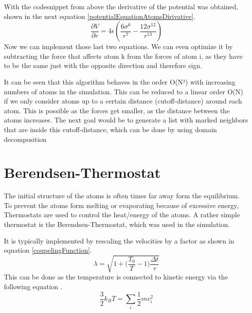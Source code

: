 With the codesnippet from above the derivative of the potential was obtained, shown in the next equation \ref{potentialEquationAtomsDirivative}.
\begin{equation}
	\label{potentialEquationAtomsDirivative}
	\frac{\partial V}{\partial r} = 4 \epsilon \left(\frac{6 \sigma^{6}}{r^{7}} - \frac{12 \sigma^{12}}{r^{13}}\right)
\end{equation}
Now we can implement those last two equations. We can even optimize it by subtracting the force that affects atom k from the forces of atom i, as they have to be the same just with the opposite direction and therefore sign. 
\par 
It can be seen that this algorithm behaves in the order O(N²) with increasing numbers of atoms in the simulation. This can be reduced to a linear order O(N) if we only consider atoms up to a certain distance (cutoff-distance) around each atom. This is possible as the forces get smaller, as the distance between the atoms increases. The next goal would be to generate a list with marked neighbors that are inside this cutoff-distance, which can be done by using domain decomposition \cite[cf.][]{molDymCourse}
\section{Berendsen-Thermostat}
\begin{comment}
- couple the moleclular system to a larger heat bath
- thermostat controls the heat of the simulation so the system does not melt or evaporate
\end{comment}
The initial structure of the atoms is often times far away form the equilibrium. To prevent the atoms form melting or evaporating because of excessive energy, Thermostats are used to control the heat/energy of the atoms. A rather simple thermostat is the Berendsen-Thermostat, which was used in the simulation. 
\par
It is typically implemented by rescaling the velocities by a factor as shown in equation \ref{coupelingFunction}. 
\begin{equation}
	\label{coupelingFunction}
	\lambda = \sqrt{1 + \bigg(\frac{T_{0}}{T} -1\bigg)\frac{\Delta t}{\tau}}
\end{equation}
This can be done as the temperature is connected to kinetic energy via the following equation \cite[cf.][]{molDymCourse}. 
\begin{equation}
	\label{bolzmann}
	\frac{3}{2} k_{B} T = \sum_{i} \frac{1}{2} m v_{i}^2
\end{equation}



